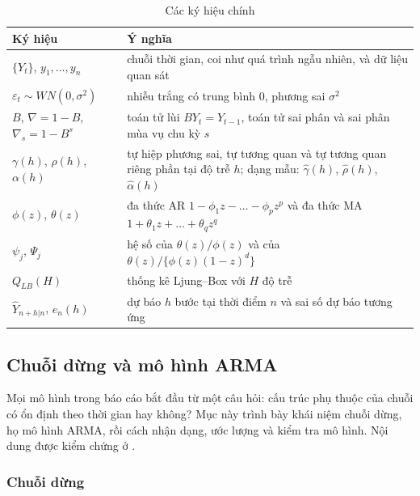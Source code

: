 \begin{table}[H]
\centering\small
\caption{Các ký hiệu chính}\label{tab:kyhieu}
\renewcommand{\arraystretch}{1.25}
\begin{tabular}{|p{3.4cm}|p{12.6cm}|}
\toprule
Ký hiệu & Ý nghĩa \\
\midrule
$\{Y_t\}$, $y_1,\dots,y_n$ & chuỗi thời gian, coi như quá trình ngẫu nhiên, và dữ liệu quan sát \\
$\varepsilon_t\sim WN(0,\sigma^2)$ & nhiễu trắng có trung bình $0$, phương sai $\sigma^2$ \\
$B$, $\nabla=1-B$, $\nabla_s=1-B^s$ & toán tử lùi $BY_t=Y_{t-1}$, toán tử sai phân và sai phân mùa vụ chu kỳ $s$ \\
$\gamma(h)$, $\rho(h)$, $\alpha(h)$ & tự hiệp phương sai, tự tương quan và tự tương quan riêng phần tại độ trễ $h$; dạng mẫu: $\hat\gamma(h)$, $\hat\rho(h)$, $\hat\alpha(h)$ \\
$\phi(z)$, $\theta(z)$ & đa thức AR $1-\phi_1z-\dots-\phi_pz^p$ và đa thức MA $1+\theta_1z+\dots+\theta_qz^q$ \\
$\psi_j$, $\Psi_j$ & hệ số của $\theta(z)/\phi(z)$ và của $\theta(z)/\{\phi(z)(1-z)^d\}$ \\
$Q_{LB}(H)$ & thống kê Ljung--Box với $H$ độ trễ \\
$\hat Y_{n+h|n}$, $e_n(h)$ & dự báo $h$ bước tại thời điểm $n$ và sai số dự báo tương ứng \\
\bottomrule
\end{tabular}
\end{table}

\subsection{Chuỗi dừng và mô hình ARMA}

Mọi mô hình trong báo cáo bắt đầu từ một câu hỏi: cấu trúc phụ thuộc của chuỗi có ổn định theo thời gian hay không? Mục này trình bày khái niệm chuỗi dừng, họ mô hình ARMA, rồi cách nhận dạng, ước lượng và kiểm tra mô hình. Nội dung được kiểm chứng ở .

\subsubsection{Chuỗi dừng}

